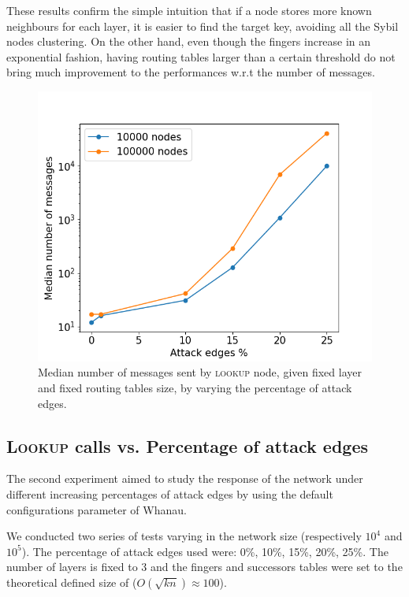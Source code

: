 These results confirm the simple intuition that if a node stores more known neighbours for each layer, it is easier to find the target key, avoiding all the Sybil nodes clustering. On the other hand, even though the fingers increase in an exponential fashion, having routing tables larger than a certain threshold do not bring much improvement to the performances w.r.t the number of messages.

\begin{figure}[t]
    \centering
    \includegraphics[scale=0.4]{exp2.png}
    \caption{Median number of messages sent by \textsc{lookup} node, given fixed layer and fixed routing tables size, by varying the percentage of attack edges.}
    \label{fig:experiment_2}
\end{figure}

\subsection{\textsc{Lookup} calls vs. Percentage of attack edges}

The second experiment aimed to study the response of the network under different increasing percentages of attack edges by using the default configurations parameter of Whanau.

We conducted two series of tests varying in the network size (respectively $10^4$ and $10^5$). The percentage of attack edges used were: 0\%, 10\%, 15\%, 20\%, 25\%. The number of layers is fixed to 3 and the fingers and successors tables were set to the theoretical defined size of  ($O(\sqrt{kn}) \approx 100$).

